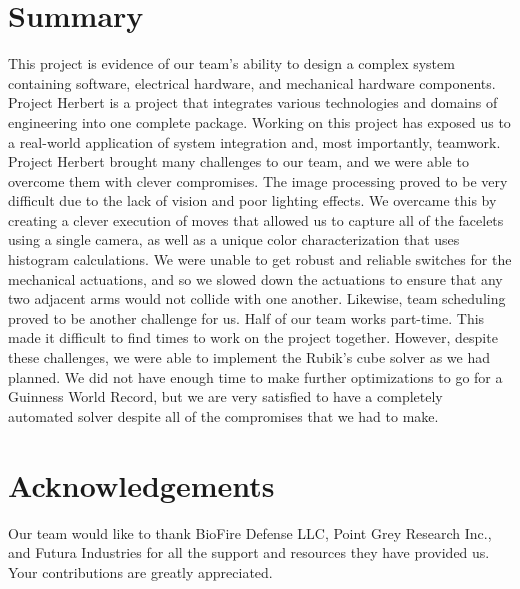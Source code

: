 \documentclass[final, letterpaper, 10 pt, conference, twocolumn]{IEEEtran}
\begin{document}
\section{Summary}
This project is evidence of our team's ability to design a complex system containing software, electrical hardware, and mechanical hardware components. Project Herbert is a project that integrates various technologies and domains of engineering into one complete package. Working on this project has exposed us to a real-world application of system integration and, most importantly, teamwork. Project Herbert brought many challenges to our team, and we were able to overcome them with clever compromises. The image processing proved to be very difficult due to the lack of vision and poor lighting effects. We overcame this by creating a clever execution of moves that allowed us to capture all of the facelets using a single camera, as well as a unique color characterization that uses histogram calculations. We were unable to get robust and reliable switches for the mechanical actuations, and so we slowed down the actuations to ensure that any two adjacent arms would not collide with one another. Likewise, team scheduling proved to be another challenge for us. Half of our team works part-time. This made it difficult to find times to work on the project together. However, despite these challenges, we were able to implement the Rubik's cube solver as we had planned. We did not have enough time to make further optimizations to go for a Guinness World Record, but we are very satisfied to have a completely automated solver despite all of the compromises that we had to make. \section{Acknowledgements}
Our team would like to thank BioFire Defense LLC, Point Grey Research Inc., and Futura Industries for all the support and resources they have provided us. Your contributions are greatly appreciated.
\end{document}
